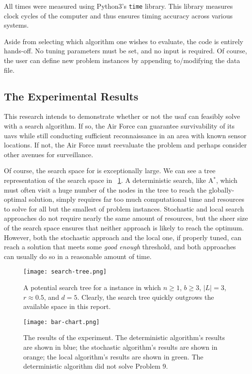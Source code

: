 \documentclass[../main.tex]{subfiles}
\begin{document}
All times were measured using Python3's \texttt{time} library. This library measures clock cycles of the computer and thus ensures timing accuracy across various systems.

Aside from selecting which algorithm one wishes to evaluate, the code is entirely hands-off. No tuning parameters must be set, and no input is required. Of course, the user can define new problem instances by appending to/modifying the data file.

\subsection{The Experimental Results}

This research intends to demonstrate whether or not the \ac{usaf} can feasibly solve \probs with a search algorithm. If so, the Air Force can guarantee survivability of its \acp{uav} while still conducting sufficient reconnaissance in an area with known sensor locations. If not, the Air Force must reevaluate the problem and perhaps consider other avenues for surveillance.

Of course, the search space for \probs is exceptionally large. We can see a tree representation of the search space in \figurename\ \ref{fig:search-tree}. A deterministic search, like A$^*$, which must often visit a huge number of the nodes in the tree to reach the globally-optimal solution, simply requires far too much computational time and resources to solve \probs for all but the smallest of problem instances. Stochastic and local search approaches do not require nearly the same amount of resources, but the sheer size of the search space ensures that neither approach is likely to reach the optimum. However, both the stochastic approach and the local one, if properly tuned, can reach a solution that meets some \textit{good enough} threshold, and both approaches can usually do so in a reasonable amount of time.

\begin{figure}
    \centerline{\texttt{[image: search-tree.png]}}
    \caption{A potential search tree for a \probs instance in which $n\geq 1$, $b\geq 3$, $|L|=3$, $r\approx 0.5$, and $d=5$. Clearly, the search tree quickly outgrows the available space in this report.}
    \label{fig:search-tree}
\end{figure}

\begin{figure}
    \centerline{\texttt{[image: bar-chart.png]}}
    \caption{The results of the experiment. The deterministic algorithm's results are shown in blue; the stochastic algorithm's results are shown in orange; the local algorithm's results are shown in green. The deterministic algorithm did not solve Problem 9.}
    \label{fig:results-bar-chart}
\end{figure}
\end{document}
